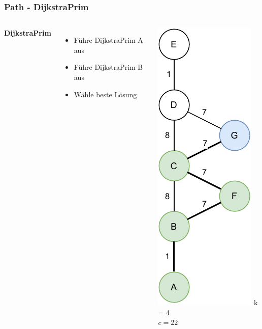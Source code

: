 \documentclass[aspectratio=169]{beamer}
\begin{document}
\begin{frame}
	\frametitle{Path - DijkstraPrim}
	\begin{columns}[c] %
		
		\textbf{DijkstraPrim}
		\begin{itemize}
			\item Führe DijkstraPrim-A aus
			\item Führe DijkstraPrim-B aus
			\item Wähle beste Lösung 
		\end{itemize}
		\includegraphics[scale=.6]{path_dijkstraAprim.pdf}
		k = 4\\
		$c = 22$
		
		
	\end{columns}
	\end{frame}
	
\end{document}

